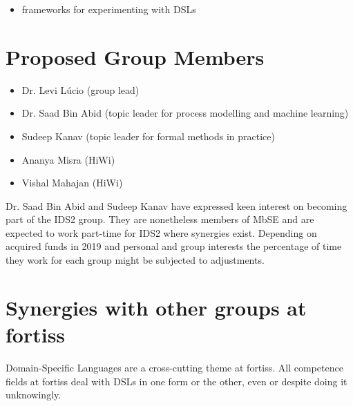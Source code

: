 \documentclass{article}
\begin{document}
\begin{itemize}
  \item frameworks for experimenting with DSLs
\end{itemize}

\section{Proposed Group Members}

\begin{itemize}
  \item Dr. Levi L\'ucio (group lead)
  \item Dr. Saad Bin Abid (topic leader for process modelling and machine
  learning)
  \item Sudeep Kanav (topic leader for formal methods in practice)
  \item Ananya Misra (HiWi)
  \item Vishal Mahajan (HiWi)
\end{itemize}

Dr. Saad Bin Abid and Sudeep Kanav have expressed keen interest on becoming part
of the IDS2 group. They are nonetheless members of MbSE and are
expected to work part-time for IDS2 where synergies exist. Depending on acquired
funds in 2019 and personal and group interests the percentage of time they work
for each group might be subjected to adjustments.

\section{Synergies with other groups at fortiss}

Domain-Specific Languages are a cross-cutting theme at fortiss. All
competence fields at fortiss deal with DSLs in one form or the
other, even or despite doing it unknowingly.
\end{document}
